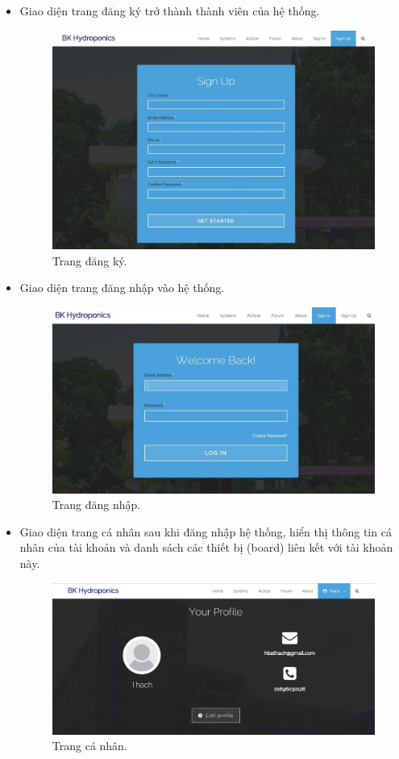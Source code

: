 \documentclass[a4paper,12pt,oneside]{article}
\begin{document}
\begin{itemize}
\item Giao diện trang đăng ký trở thành thành viên của hệ thống. 
\begin{figure}[H]
\centering
\includegraphics[scale=.45]{hinh/web_register.jpg}
\caption{Trang đăng ký.}
\end{figure}

\item Giao diện trang đăng nhập vào hệ thống.
\begin{figure}[H]
\centering
\includegraphics[scale=.45]{hinh/web_login.jpg}
\caption{Trang đăng nhập.}
\end{figure}

\item Giao diện trang cá nhân sau khi đăng nhập hệ thống, hiển thị thông tin cá nhân của tài khoản và danh sách các thiết bị (board) liên kết với tài khoản này.
\begin{figure}[H]
\centering
\includegraphics[scale=.45]{hinh/web_profile.png}
\caption{Trang cá nhân.}
\end{figure}


\end{itemize}
\end{document}

